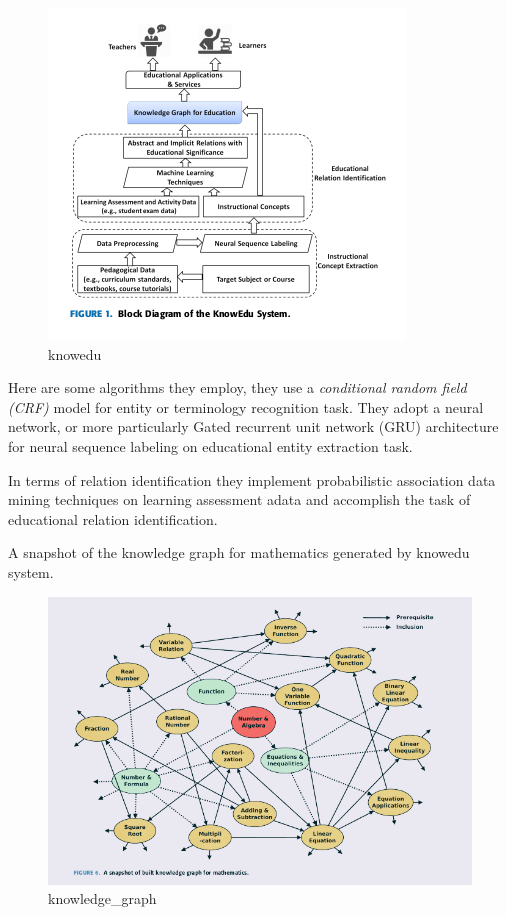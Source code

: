 \documentclass[]{book}
\theoremstyle{definition}
\theoremstyle{definition}
\theoremstyle{definition}
\theoremstyle{remark}
\begin{document}
\begin{figure}
\centering
\includegraphics{img/knowedu.png}
\caption{knowedu}
\end{figure}

Here are some algorithms they employ, they use a \emph{conditional
random field (CRF)} model for entity or terminology recognition task.
They adopt a neural network, or more particularly Gated recurrent unit
network (GRU) architecture for neural sequence labeling on educational
entity extraction task.

In terms of relation identification they implement probabilistic
association data mining techniques on learning assessment adata and
accomplish the task of educational relation identification.

A snapshot of the knowledge graph for mathematics generated by knowedu
system.

\begin{figure}
\centering
\includegraphics{img/kg.png}
\caption{knowledge\_graph}
\end{figure}
\end{document}
